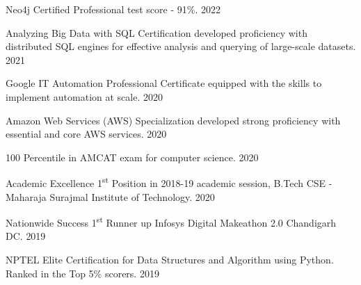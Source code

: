 
\begin{cvhonors}

  \cvhonor
    {Neo4j Certified Professional} %
    {test score - 91\%.} %
    {2022} %

  \cvhonor
    {Analyzing Big Data with SQL Certification} %
    {developed proficiency with distributed SQL engines for effective analysis and querying of large-scale datasets.} %
    {2021} %

  \cvhonor
    {Google IT Automation Professional Certificate} %
    {equipped with the skills to implement automation at scale.} %
    {2020} %

  \cvhonor
    {Amazon Web Services (AWS) Specialization} %
    {developed strong proficiency with essential and core AWS services.} %
    {2020} %
    
  \cvhonor
    {100 Percentile} %
    {in AMCAT exam for computer science.} %
    {2020} %

  \cvhonor
    {Academic Excellence} %
    {1\textsuperscript{st} Position in 2018-19 academic session, B.Tech CSE - Maharaja Surajmal Institute of Technology.} %
    {2020} %

  \cvhonor
    {Nationwide Success} %
    {1\textsuperscript{st} Runner up Infosys Digital Makeathon 2.0 Chandigarh DC.} %
    {2019} %

  \cvhonor
    {NPTEL Elite Certification} %
    {for Data Structures and Algorithm using Python. Ranked in the Top 5\% scorers.} %
    {2019} %

\end{cvhonors}

